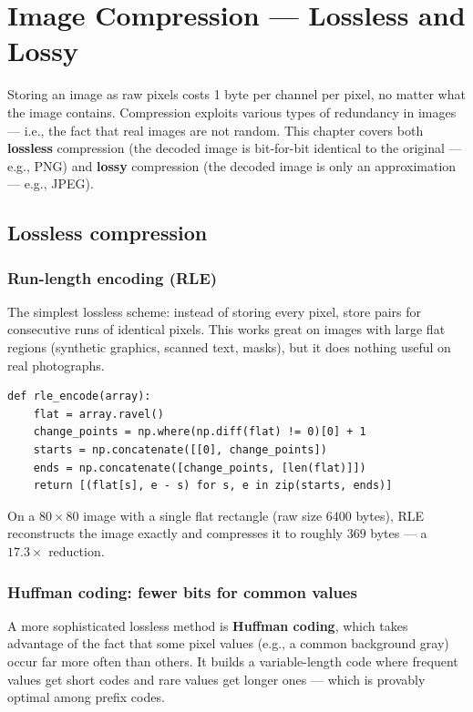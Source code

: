 \chapter{Image Compression --- Lossless and Lossy}
\label{ch:lesson17}

Storing an image as raw pixels costs 1 byte per channel per pixel, no matter what the image contains. Compression exploits various types of redundancy in images --- i.e., the fact that real images are not random. This chapter covers both \textbf{lossless} compression (the decoded image is bit-for-bit identical to the original --- e.g., PNG) and \textbf{lossy} compression (the decoded image is only an approximation --- e.g., JPEG).

\section{Lossless compression}

\subsection*{Run-length encoding (RLE)}

The simplest lossless scheme: instead of storing every pixel, store  pairs for consecutive runs of identical pixels. This works great on images with large flat regions (synthetic graphics, scanned text, masks), but it does nothing useful on real photographs.

\begin{lstlisting}
def rle_encode(array):
    flat = array.ravel()
    change_points = np.where(np.diff(flat) != 0)[0] + 1
    starts = np.concatenate([[0], change_points])
    ends = np.concatenate([change_points, [len(flat)]])
    return [(flat[s], e - s) for s, e in zip(starts, ends)]
\end{lstlisting}

On a $80\times80$ image with a single flat rectangle (raw size $6400$ bytes), RLE reconstructs the image exactly and compresses it to roughly $369$ bytes --- a $17.3\times$ reduction.

\subsection*{Huffman coding: fewer bits for common values}

A more sophisticated lossless method is \textbf{Huffman coding}, which takes advantage of the fact that some pixel values (e.g., a common background gray) occur far more often than others. It builds a variable-length code where frequent values get short codes and rare values get longer ones --- which is provably optimal among prefix codes.

